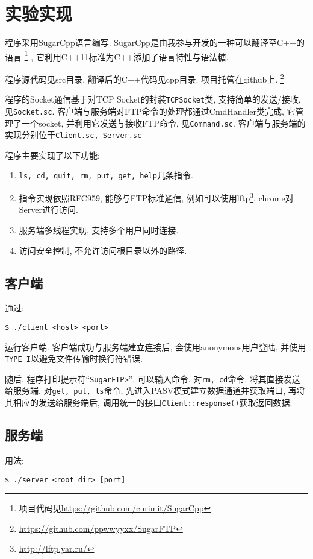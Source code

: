 
\section{实验实现}
程序采用SugarCpp语言编写. SugarCpp是由我参与开发的一种可以翻译至C++的语言
\footnote{项目代码见\url{https://github.com/curimit/SugarCpp}}
, 它利用C++11标准为C++添加了语言特性与语法糖.

程序源代码见src目录, 翻译后的C++代码见cpp目录. 项目托管在github上. \footnote{\url{https://github.com/ppwwyyxx/SugarFTP}}

程序的Socket通信基于对TCP Socket的封装\verb|TCPSocket|类, 支持简单的发送/接收, 见\verb|Socket.sc|.
客户端与服务端对FTP命令的处理都通过CmdHandler类完成, 它管理了一个socket, 并利用它发送与接收FTP命令, 见\verb|Command.sc|.
客户端与服务端的实现分别位于\verb|Client.sc, Server.sc|

程序主要实现了以下功能:
\begin{enumerate}
  \item \verb|ls, cd, quit, rm, put, get, help|几条指令.

  \item 指令实现依照RFC959, 能够与FTP标准通信, 例如可以使用lftp\footnote{\url{http://lftp.yar.ru/}}, chrome对Server进行访问.

  \item 服务端多线程实现, 支持多个用户同时连接.

  \item 访问安全控制, 不允许访问根目录以外的路径.
\end{enumerate}

\subsection{客户端}
通过:
\begin{lstlisting}
$ ./client <host> <port>
\end{lstlisting}
运行客户端. 客户端成功与服务端建立连接后, 会使用anonymous用户登陆, 并使用\verb|TYPE I|以避免文件传输时换行符错误.

随后, 程序打印提示符``\verb|SugarFTP>|'', 可以输入命令. 对\verb|rm, cd|命令, 将其直接发送给服务端.
对\verb|get, put, ls|命令, 先进入PASV模式建立数据通道并获取端口, 再将其相应的发送给服务端后, 调用统一的接口\verb|Client::response()|获取返回数据.

\subsection{服务端}
用法:
\begin{lstlisting}
$ ./server <root dir> [port]
\end{lstlisting}

